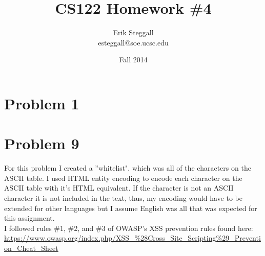 \documentclass{article}
\title{CS122 Homework \#4}
\author{Erik Steggall \\ esteggall@soe.ucsc.edu}
\date{Fall 2014}
\begin{document}
 \maketitle \pagestyle{empty}
\section*{Problem 1}


\section*{Problem 9}
For this problem I created a ''whitelist". which was all of the characters on the ASCII table. I used HTML entity encoding to encode each character on the ASCII table with it's HTML equivalent. If the character is not an ASCII character it is not included in the text, thus, my encoding would have to be extended for other languages but I assume English was all that was expected for this assignment.\\
I followed rules \#1, \#2, and \#3 of OWASP's XSS prevention rules found here: \url{https://www.owasp.org/index.php/XSS\_\%28Cross\_Site\_Scripting\%29\_Prevention\_Cheat\_Sheet}
\end{document}
